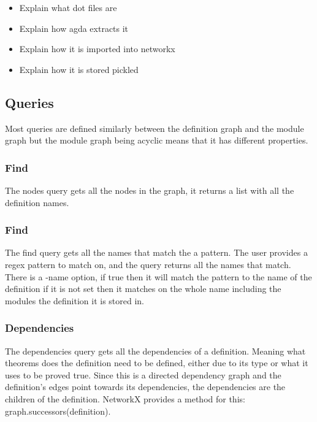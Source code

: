 \begin{itemize}
\item Explain what dot files are
\item Explain how agda extracts it
\item Explain how it is imported into networkx
\item Explain how it is stored pickled
\end{itemize}

\subsection{Queries}

Most queries are defined similarly between the definition graph and the module
graph but the module graph being acyclic means that it has different
properties. 


\subsubsection{Find}

The nodes query gets all the nodes in the graph, it returns a list with all the
definition names.

\subsubsection{Find}

The find query gets all the names that match the a pattern. The user provides a
regex pattern to match on, and the query returns all the names that match.
There is a -name option, if true then it will match the pattern to the name of
the definition if it is not set then it matches on the whole name including the
modules the definition it is stored in.

\subsubsection{Dependencies}

The dependencies query gets all the dependencies of a definition. Meaning what
theorems does the definition need to be defined, either due to its type or what
it uses to be proved true. Since this is a directed dependency graph and the
definition's edges point towards its dependencies, the dependencies are the
children of the definition. NetworkX provides a method for this:
\textsf{graph.successors(definition)}.


